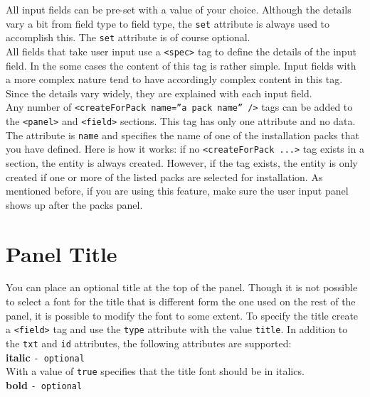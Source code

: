 All input fields can be pre-set with a value of your choice. Although
the details vary a bit from field type to field type, the \texttt{set}
attribute is always used to accomplish this. The \texttt{set} attribute
is of course optional.\\

All fields that take user input use a \texttt{<spec>} tag to define the
details of the input field. In the some cases the content of this tag is
rather simple. Input fields with a more complex nature tend to have
accordingly complex content in this tag. Since the details vary widely,
they are explained with each input field.\\

Any number of \texttt{<createForPack name=''a pack name'' />} tags can be
added to the \texttt{<panel>} and \texttt{<field>} sections. This tag
has only one attribute and no data. The attribute is \texttt{name} and
specifies the name of one of the installation packs that you have
defined. Here is how it works: if no \texttt{<createForPack ...>} tag
exists in a section, the entity is always created. However, if the tag
exists, the entity is only created if one or more of the listed packs
are selected for installation. As mentioned before, if you are using
this feature, make sure the user input panel shows up after the packs
panel.\\

\section{Panel Title}

You can place an optional title at the top of the panel. Though it is
not possible to select a font for the title that is different form the
one used on the rest of the panel, it is possible to modify the font to
some extent. To specify the title create a \texttt{<field>} tag and use
the \texttt{type} attribute with the value \texttt{title}. In addition
to the \texttt{txt} and \texttt{id} attributes, the following attributes
are supported:\\

\textbf{italic} \texttt{- optional}\\

With a value of \texttt{true} specifies that the title font should be in italics.\\

\textbf{bold} \texttt{- optional}\\

